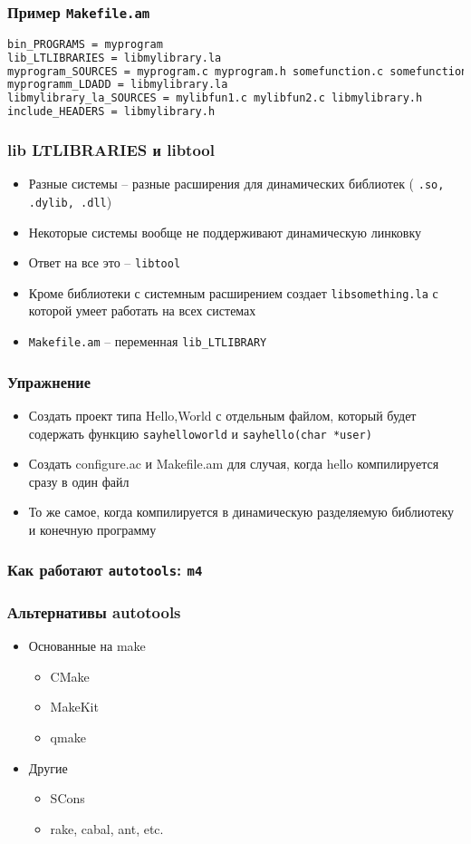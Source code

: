 \begin{frame}[fragile]
\frametitle{Пример \texttt{Makefile.am}}
\begin{lstlisting}[language=sh]
bin_PROGRAMS = myprogram
lib_LTLIBRARIES = libmylibrary.la
myprogram_SOURCES = myprogram.c myprogram.h somefunction.c somefunction.h
myprogramm_LDADD = libmylibrary.la 
libmylibrary_la_SOURCES = mylibfun1.c mylibfun2.c libmylibrary.h
include_HEADERS = libmylibrary.h
\end{lstlisting}
\end{frame}

\begin{frame}[fragile]
\frametitle{lib LTLIBRARIES и libtool}
\begin{itemize}
 \item Разные системы -- разные расширения для динамических библиотек (
\texttt{.so, .dylib, .dll})
 \item Некоторые системы вообще не поддерживают динамическую линковку
 \item Ответ на все это -- \texttt{libtool}
 \item Кроме библиотеки с системным расширением создает \texttt{libsomething.la} с которой умеет работать на всех системах
 \item \texttt{Makefile.am} -- переменная \verb+lib_LTLIBRARY+ 
\end{itemize}
\end{frame}

\begin{frame}
 \frametitle{Упражнение}
 \begin{itemize}
  \item Создать проект типа Hello,World с отдельным файлом, который будет содержать функцию \texttt{sayhelloworld} и \texttt{sayhello(char *user)} 
  \item Создать configure.ac и Makefile.am для случая, когда hello компилируется сразу в один файл
  \item То же самое, когда компилируется в динамическую разделяемую библиотеку и конечную программу
 \end{itemize}
\end{frame}

\begin{frame}
 \frametitle{Как работают \texttt{autotools}: \texttt{m4}}
\end{frame}

\begin{frame}
 \frametitle{Альтернативы autotools}
\begin{itemize}
  \item{Основанные на make}
  \begin{itemize}
    \item CMake
    \item MakeKit
    \item qmake
  \end{itemize}
  \item{Другие}
    \begin{itemize}
      \item SCons
      \item rake, cabal, ant, etc.
    \end{itemize}
\end{itemize}
\end{frame}

